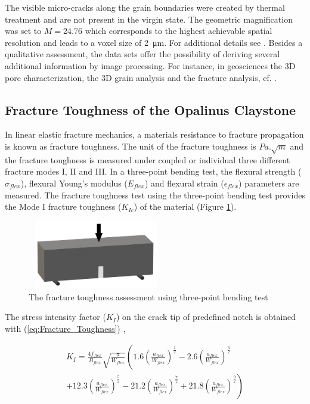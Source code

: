 The visible micro-cracks along the grain boundaries were created by thermal treatment and are not present in the virgin state.  The geometric magnification was set to $M = 24.76$ which corresponds to the highest achievable spatial resolution and leads to a voxel size of \SI{2}{\micro\meter}. For additional details see \textcolor{red}{\cite{Ruf2020}}. Besides a qualitative assessment, the data sets offer the possibility of deriving several additional information by image processing. For instance, in geosciences the 3D pore characterization, the 3D grain analysis and the fracture analysis, cf. \cite{Cnudde2013}. 

\subsection{Fracture Toughness of the Opalinus Claystone}
\label{sec:Fracture_Toughness_Exp}
In linear elastic fracture mechanics, a materials resistance to fracture propagation is known as fracture toughness. The unit of the fracture toughness is $Pa.\sqrt m$ and the fracture toughness is measured under coupled or individual three different fracture modes I, II and III. In a three-point bending test, the flexural strength ($\sigma_{flex}$), flexural Young's modulus ($E_{flex}$) and flexural strain ($\epsilon_{flex}$) parameters are measured. The fracture toughness test using the three-point bending test provides the Mode I fracture toughness ($K_{Ic}$) of the material (Figure \ref{fig:Amir_Fracture_Toughness_Theory}).

\begin{figure}[!ht]
\centering
\includegraphics[width=6cm,height=3cm]{figures/Amir_Fracture_Toughness_Theory.png}
\caption{The fracture toughness assessment using three-point bending test}
\label{fig:Amir_Fracture_Toughness_Theory}
\end{figure} 

The stress intensity factor ($K_I$) on the crack tip of predefined notch is obtained with (\ref{eq:Fracture_Toughness}) \cite{Bower2009},

\begin{multline}
\label{eq:Fracture_Toughness}
K_I=
\frac{4f_{flex}}{B_{flex}}
\sqrt{\frac{\pi}{W_{flex}}}
\left(1.6
\left(\frac{a_{flex}}{W_{flex}}\right)^\frac{1}{2}
-
2.6\left(\frac{a_{flex}}{W_{flex}}\right)^\frac{3}{2} 
\right.
\\ 
\left.
+12.3\left(\frac{a_{flex}}{W_{flex}}\right)^\frac{5}{2} -21.2\left(\frac{a_{flex}}{W_{flex}}\right)^\frac{7}{2}
+21.8\left(\frac{a_{flex}}{W_{flex}}\right)^\frac{9}{2}
\right)
\end{multline}

